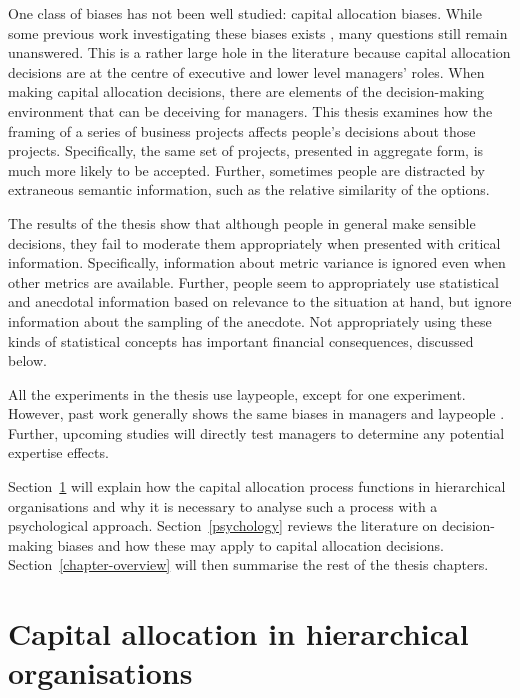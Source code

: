 \documentclass[a4paper, nobind, dvipsnames]{templates/ociamthesis}
\theoremstyle{definition}
\theoremstyle{definition}
\theoremstyle{definition}
\theoremstyle{definition}
\theoremstyle{remark}
\begin{document}
One class of biases has not been well studied: capital allocation biases. While
some previous work investigating these biases exists \autocite[e.g.,][]{bardolet2011}, many
questions still remain unanswered. This is a rather large hole in the literature
because capital allocation decisions are at the centre of executive and lower
level managers' roles. When making capital allocation decisions, there are
elements of the decision-making environment that can be deceiving for managers.
This thesis examines how the framing of a series of business projects affects
people's decisions about those projects. Specifically, the same set of projects,
presented in aggregate form, is much more likely to be accepted. Further,
sometimes people are distracted by extraneous semantic information, such as the
relative similarity of the options.

The results of the thesis show that although people in general make sensible
decisions, they fail to moderate them appropriately when presented with critical
information. Specifically, information about metric variance is ignored even
when other metrics are available. Further, people seem to appropriately use
statistical and anecdotal information based on relevance to the situation at
hand, but ignore information about the sampling of the anecdote. Not
appropriately using these kinds of statistical concepts has important
financial consequences, discussed below.

All the experiments in the thesis use laypeople, except for one experiment.
However, past work generally shows the same biases in managers and laypeople
\autocite[with some showing more bias in managers, e.g.,][]{haigh2005}. Further, upcoming
studies will directly test managers to determine any potential expertise
effects.

Section~\ref{capital-allocation} will explain how the capital allocation
process functions in hierarchical organisations and why it is necessary to
analyse such a process with a psychological approach. Section~\ref{psychology}
reviews the literature on decision-making biases and how these may apply to
capital allocation decisions. Section~\ref{chapter-overview} will then
summarise the rest of the thesis chapters.

\hypertarget{capital-allocation}{%
\section{Capital allocation in hierarchical organisations}\label{capital-allocation}}
\end{document}

